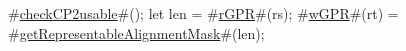 #\hyperref[sailMIPSzcheckCP2usable]{checkCP2usable}#();
let len = #\hyperref[sailMIPSzrGPR]{rGPR}#(rs);
#\hyperref[sailMIPSzwGPR]{wGPR}#(rt) = #\hyperref[sailMIPSzgetRepresentableAlignmentMask]{getRepresentableAlignmentMask}#(len);
